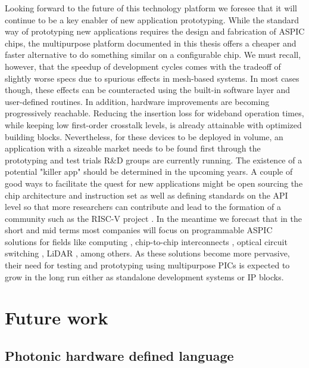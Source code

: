 Looking forward to the future of this technology platform we foresee that it will continue to be a key enabler of new application prototyping.
While the standard way of prototyping new applications requires the design and fabrication of ASPIC chips, the multipurpose platform documented in this thesis offers a cheaper and faster alternative to do something similar on a configurable chip.
We must recall, however, that the speedup of development cycles comes with the tradeoff of slightly worse specs due to spurious effects in mesh-based systems.
In most cases though, these effects can be counteracted using the built-in software layer and user-defined routines.
In addition, hardware improvements are becoming progressively reachable.
Reducing the insertion loss for wideband operation  times, while keeping low first-order crosstalk levels, is already attainable with optimized building blocks.
Nevertheless, for these devices to be deployed in volume, an application with a sizeable market needs to be found first through the prototyping and test trials R\&D groups are currently running.
The existence of a potential "killer app" should be determined in the upcoming years.
A couple of good ways to facilitate the quest for new applications might be open sourcing the chip architecture and instruction set as well as defining standards on the API level so that more researchers can contribute and lead to the formation of a community such as the RISC-V project \cite{noauthor_risc-v_nodate}.
In the meantime we forecast that in the short and mid terms most companies will focus on programmable ASPIC solutions for fields like computing \cite{noauthor_akhetonics_nodate}, chip-to-chip interconnects \cite{noauthor_celestial_nodate,noauthor_passage_nodate}, optical circuit switching \cite{noauthor_ipronics_nodate, noauthor_salience_nodate}, LiDAR \cite{noauthor_opa_2021}, among others.
As these solutions become more pervasive, their need for testing and prototyping using multipurpose PICs is expected to grow in the long run either as standalone development systems or IP blocks.

\section{Future work}\label{sec:future_work} %
\subsection{Photonic hardware defined language}\label{sub:phdl} %

